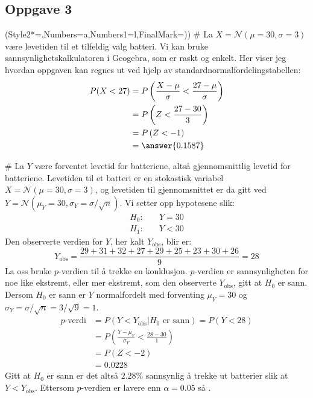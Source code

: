 \subsection*{Oppgave 3}
\begin{easylist}[enumerate]
	\ListProperties(Style2*=,Numbers=a,Numbers1=l,FinalMark={)})
	# La $X = \mathcal{N}(\mu = 30, \sigma = 3)$ være levetiden til  et tilfeldig valg batteri.
	Vi kan bruke sannsynlighetskalkulatoren i Geogebra, som er raskt og enkelt. Her viser jeg hvordan oppgaven kan regnes ut
	ved hjelp av standardnormalfordelingstabellen:
	\begin{align*}
		P(X < 27) &= P\left( \frac{X - \mu}{\sigma} < \frac{27 - \mu}{\sigma} \right) \\
		&= P\left( Z < \frac{27 - 30}{3} \right) \\
		&= P\left( Z < -1 \right) \\
		&=\answer{ 0.1587} 
	\end{align*}
	
	# La $Y$ være forventet levetid for batteriene, altså gjennomsnittlig levetid for batteriene. Levetiden til et batteri er en stokastisk variabel $X = \mathcal{N}(\mu = 30, \sigma = 3)$, og levetiden til gjennomsnittet er da gitt ved $Y = \mathcal{N}(\mu_Y = 30, \sigma_Y = \sigma / \sqrt{n})$. Vi setter opp hypotesene slik:
	\begin{align*}
		H_0 : \quad & Y = 30 \\
		H_1 : \quad & Y < 30 
	\end{align*}
	Den observerte verdien for $Y$, her kalt $Y_{\text{obs}}$, blir er:
	\begin{equation*}
		Y_{\text{obs}} = \frac{29+31+32+27+29+25+23+30+26}{9} = 28
	\end{equation*}
	La oss bruke $p$-verdien til å trekke en konklusjon. $p$-verdien er sannsynligheten for noe like ekstremt, eller mer ekstremt, som den observerte $Y_{\text{obs}}$, gitt at $H_0$ er sann.
	Dersom $H_0$ er sann er $Y$ normalfordelt med forventing $\mu_Y = 30$ og $\sigma_Y = \sigma / \sqrt{n} = 3 /\sqrt{9} = 1$.
	\begin{align*}
		p\text{-verdi} &= P(Y <Y_{\text{obs}} | H_0 \text{ er sann}) = P(Y < 28) \\
		&= P\left( \frac{Y-\mu_Y}{\sigma_Y} < \frac{28-30}{1} \right) \\
		&= P\left( Z < -2 \right) \\
		&= 0.0228
	\end{align*}
	Gitt at $H_0$ er sann er det altså $2.28\%$ sannsynlig å trekke ut batterier
	slik at $Y <Y_{\text{obs}}$. Ettersom $p$-verdien er lavere enn $\alpha = 0.05$
	så .
\end{easylist}


